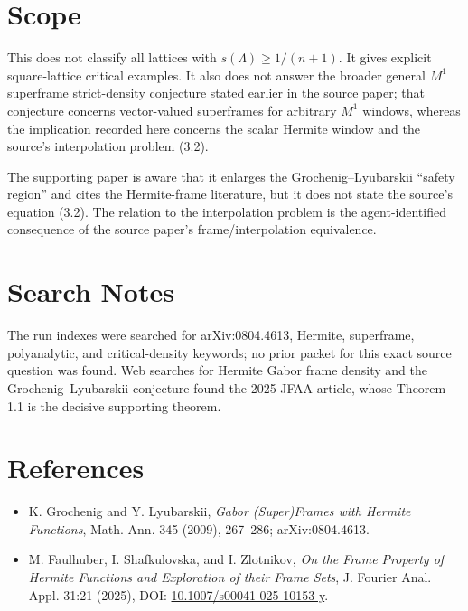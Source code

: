 \documentclass[11pt]{article}
\begin{document}
\section{Scope}

This does not classify all lattices with \(s(\Lambda)\ge 1/(n+1)\).  It gives
explicit square-lattice critical examples.  It also does not answer the broader
general \(M^1\) superframe strict-density conjecture stated earlier in the
source paper; that conjecture concerns vector-valued superframes for arbitrary
\(M^1\) windows, whereas the implication recorded here concerns the scalar
Hermite window and the source's interpolation problem (3.2).

The supporting paper is aware that it enlarges the Grochenig--Lyubarskii
``safety region'' and cites the Hermite-frame literature, but it does not state
the source's equation (3.2).  The relation to the interpolation problem is the
agent-identified consequence of the source paper's frame/interpolation
equivalence.

\section{Search Notes}

The run indexes were searched for arXiv:0804.4613, Hermite, superframe,
polyanalytic, and critical-density keywords; no prior packet for this exact
source question was found.  Web searches for Hermite Gabor frame density and
the Grochenig--Lyubarskii conjecture found the 2025 JFAA article, whose
Theorem 1.1 is the decisive supporting theorem.

\section{References}

\begin{itemize}[leftmargin=*]
\item K. Grochenig and Y. Lyubarskii, \emph{Gabor (Super)Frames with Hermite
Functions}, Math. Ann. 345 (2009), 267--286; arXiv:0804.4613.
\item M. Faulhuber, I. Shafkulovska, and I. Zlotnikov, \emph{On the Frame
Property of Hermite Functions and Exploration of their Frame Sets}, J. Fourier
Anal. Appl. 31:21 (2025), DOI: \href{https://doi.org/10.1007/s00041-025-10153-y}{10.1007/s00041-025-10153-y}.
\end{itemize}
\end{document}
